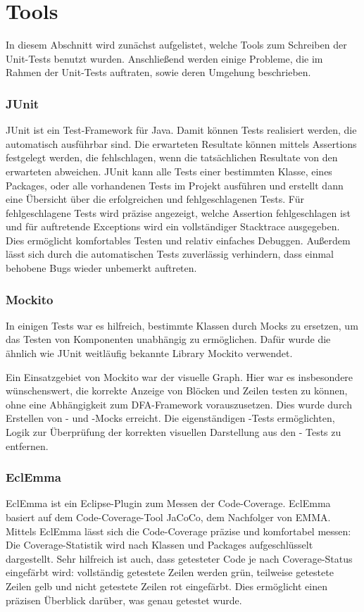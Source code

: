 \part{Tools}
In diesem Abschnitt wird zunächst aufgelistet, welche Tools zum Schreiben der Unit-Tests benutzt wurden.
Anschließend werden einige Probleme, die im Rahmen der Unit-Tests auftraten, sowie deren Umgehung beschrieben.

\section{JUnit}
JUnit ist ein Test-Framework für Java.
Damit können Tests realisiert werden, die automatisch ausführbar sind.
Die erwarteten Resultate können mittels Assertions festgelegt werden, die fehlschlagen, wenn die tatsächlichen Resultate von den erwarteten abweichen.
JUnit kann alle Tests einer bestimmten Klasse, eines Packages, oder alle vorhandenen Tests im Projekt ausführen und erstellt dann eine Übersicht über die erfolgreichen und fehlgeschlagenen Tests.
Für fehlgeschlagene Tests wird präzise angezeigt, welche Assertion fehlgeschlagen ist und für auftretende Exceptions wird ein vollständiger Stacktrace ausgegeben.
Dies ermöglicht komfortables Testen und relativ einfaches Debuggen.
Außerdem lässt sich durch die automatischen Tests zuverlässig verhindern, dass einmal behobene Bugs wieder unbemerkt auftreten.

\section{Mockito}
In einigen Tests war es hilfreich, bestimmte Klassen durch Mocks zu ersetzen, um das Testen von Komponenten unabhängig zu ermöglichen.
Dafür wurde die ähnlich wie JUnit weitläufig bekannte Library Mockito verwendet.

Ein Einsatzgebiet von Mockito war der visuelle Graph.
Hier war es insbesondere wünschenswert, die korrekte Anzeige von Blöcken und Zeilen testen zu können, ohne eine Abhängigkeit zum DFA-Framework vorauszusetzen.
Dies wurde durch Erstellen von - und -Mocks erreicht.
Die eigenständigen -Tests ermöglichten, Logik zur Überprüfung der korrekten visuellen Darstellung aus den - Tests zu entfernen.

\section{EclEmma}
EclEmma ist ein Eclipse-Plugin zum Messen der Code-Coverage.
EclEmma basiert auf dem Code-Coverage-Tool JaCoCo, dem Nachfolger von EMMA.
Mittels EclEmma lässt sich die Code-Coverage präzise und komfortabel messen:
Die Coverage-Statistik wird nach Klassen und Packages aufgeschlüsselt dargestellt.
Sehr hilfreich ist auch, dass getesteter Code je nach Coverage-Status eingefärbt wird: vollständig getestete Zeilen werden grün, teilweise getestete Zeilen gelb und nicht getestete Zeilen rot eingefärbt.
Dies ermöglicht einen präzisen Überblick darüber, was genau getestet wurde.

